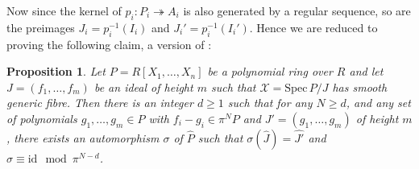 \documentclass{article}
\theoremstyle{definition}
\theoremstyle{plain}
\newtheorem{prop}[defn]{Proposition}
\theoremstyle{remark}
\newcommand{\spec}{\mathrm{Spec}\,}
\newcommand{\onto}{\twoheadrightarrow}
\newcommand{\id}{\mathrm{id}}
\newcommand{\comp}[1]{\widehat{#1}}
\begin{document}
	Now since the kernel of $p_i: P_i \onto A_i$ is also generated by a regular sequence, so are the preimages $J_i = p_i^{-1}(I_i)$ and $J_i' = p_i^{-1}(I_i')$. Hence we are reduced to proving the following claim, a version of \cite[Theorem 5.1]{Cutkosky_Srinivasan_1993}:
	\begin{prop}\label{CS}
	Let $P = R[X_1, \ldots, X_n]$ be a polynomial ring over $R$ and let $J = (f_1, \ldots, f_m)$ be an ideal of height $m$ such that $\mathcal{X} = \spec P/J$ has smooth generic fibre. Then there is an integer $d\ge 1$ such that for any $N\ge d$, and any set of polynomials $g_1, \ldots, g_m\in P$ with $f_i-g_i\in \pi^N P$ and $J' = (g_1, \ldots, g_m)$ of height $m$, there exists an automorphism $\sigma$ of $\comp{P}$ such that $\sigma(\comp{J}) = \comp{J'}$ and $\sigma \equiv \id \mod {\pi^{N-d}}$.
	\end{prop}
\end{document}
